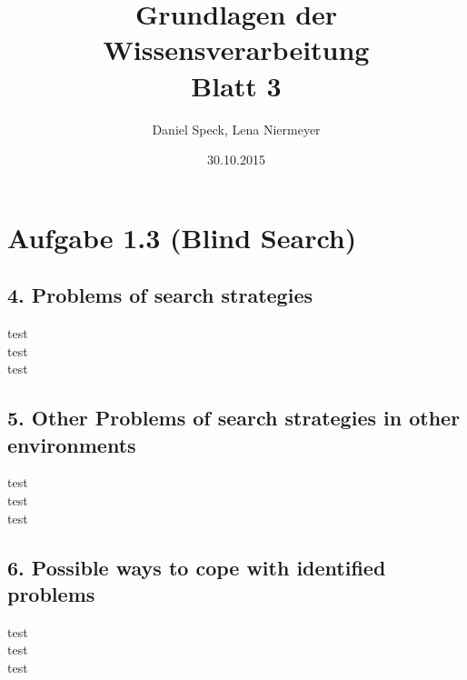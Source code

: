 \documentclass[10pt,a4paper]{article}
\title{\textbf{\huge Grundlagen der Wissensverarbeitung
\\\Large Blatt 3}}
\author{Daniel Speck, Lena Niermeyer}
\date{30.10.2015}
\begin{document}
	\maketitle


	
	\section*{Aufgabe 1.3 (Blind Search)}
	
	\subsection*{4. Problems of search strategies}

		test
		\\
		test
		\\
		test
	
			\subsection*{5. Other Problems of search strategies in other environments}
	test
	\\
	test
	\\
	test
	
				\subsection*{6. Possible ways to cope with identified problems}
	test
	\\
	test
	\\
	test
		
\end{document}

